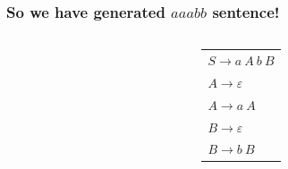 \documentclass[11pt]{beamer}
\begin{document}
\begin{frame}[noframenumbering]
\frametitle{So we have generated $aaabb$ sentence!}
\begin{columns}
	\begin{column}{0.7\textwidth}
		\begin{center}
		\end{center}
	\end{column}
	\begin{column}{0.3\textwidth}
		\begin{tabular}{l} $S \rightarrow a\ A\ b\ B$ \\ 
											 $A \rightarrow \varepsilon$ \\
											 $A \rightarrow a\ A$ \\
											 $B \rightarrow \varepsilon$ \\
											 $B \rightarrow b\ B$ \\
		\end{tabular}
	\end{column}
\end{columns}
\end{frame}
\end{document}
